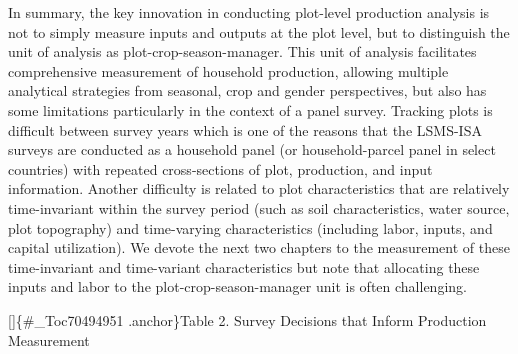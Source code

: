 \documentclass[
]{book}
\begin{document}
In summary, the key innovation in conducting plot-level production analysis is not to simply measure inputs and outputs at the plot level, but to distinguish the unit of analysis as plot-crop-season-manager. This unit of analysis facilitates comprehensive measurement of household production, allowing multiple analytical strategies from seasonal, crop and gender perspectives, but also has some limitations particularly in the context of a panel survey. Tracking plots is difficult between survey years which is one of the reasons that the LSMS-ISA surveys are conducted as a household panel (or household-parcel panel in select countries) with repeated cross-sections of plot, production, and input information. Another difficulty is related to plot characteristics that are relatively time-invariant within the survey period (such as soil characteristics, water source, plot topography) and time-varying characteristics (including labor, inputs, and capital utilization). We devote the next two chapters to the measurement of these time-invariant and time-variant characteristics but note that allocating these inputs and labor to the plot-crop-season-manager unit is often challenging.

{[}{]}\{\#\_Toc70494951 .anchor\}Table 2. Survey Decisions that Inform Production Measurement
\end{document}
